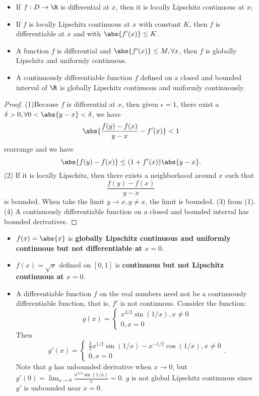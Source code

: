 \begin{refsection}
\begin{lemma}
	\cite[312]{johnsonbaugh2010foundations}\hfill
	\begin{itemize}
		\item If $f:D\to \R$ is differential at $x$, then it is locally Lipschitz continuous at $x$; 
		\item If $f$ is locally Lipschitz continuous at $x$ with constant $K$, then $f$ is differentiable at $x$ and with $\abs{f'(x)} \leq K$. 
		\item A function $f$ is differential and $\abs{f'(x)}\leq M, \forall x$, then $f$ is globally Lipschitz and uniformly continuous.
		\item A continuously differentiable function $f$ defined on a closed and bounded interval of $\R$ is globally Lipschitz continuous and uniformly continuously. 
	\end{itemize}
	
	
	
\end{lemma}
\begin{proof}
	(1)Because $f$ is differential at $x$, then given $\epsilon = 1$, there exist a $\delta > 0 ,\forall 0<\abs{y-x} < \delta$, we have
	$$\abs{\frac{f(y)-f(x)}{y-x} - f'(x)} < 1$$
	rearrange and we have
	$$\abs{f(y)-f(x)} \leq (1+f'(x))\abs{y-x}.$$(2) If it is locally Lipschitz, then there exists a neighborhood around $x$ such that $$\frac{f(y)-f(x)}{y-x}$$ is bounded. When take the limit $y\to x,y\neq x$, the limit is bounded.
	(3)
	from (1).
	(4) A continuously differentiable function on a closed and bounded interval has bounded derivatives. 
\end{proof}



\begin{example}\hfill
\begin{itemize}
	\item $f(x) = \abs{x}$ is \textbf{globally Lipschitz continuous and uniformly continuous but not differentiable at $x = 0$}.
	\item $f(x) = \sqrt{x}$ defined on $[0,1]$ is \textbf{continuous but not Lipschitz continuous at $x = 0$}.
	\item  A differentiable function $f$ on the real numbers need not be a continuously differentiable function, that is, $f'$ is not continuous.
	Consider the function:
	$$g(x) = 
	\begin{cases}
	x^{3/2}\sin(1/x),x\neq 0\\
	0,x=0
	\end{cases}$$
	Then
	$$g'(x) = 
	\begin{cases}
	\frac{3}{2}x^{1/2}\sin(1/x)-x^{-1/2}\cos(1/x),x\neq 0\\
	0,x=0
	\end{cases}.$$
	Note that $g$ has unbounded derivative when $x\to 0$, but $g'(0) = \lim_{x\to 0}\frac{	x^{3/2}\sin(1/x)}{x} = 0$. $g$ is not global Lipschitz continuous since $g'$ is unbounded near $x = 0$.
\end{itemize}	
\end{example}




\end{refsection}
